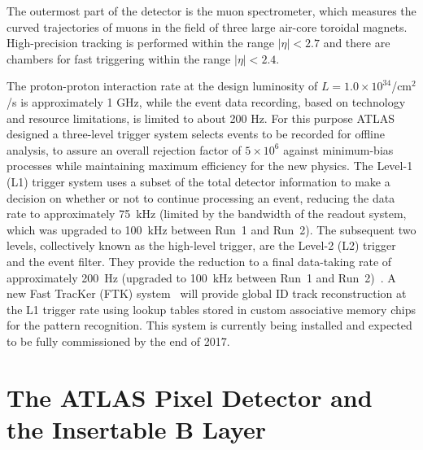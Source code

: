 The outermost part of the detector is the muon spectrometer, which measures the curved trajectories of muons in the field of three large air-core toroidal magnets. High-precision tracking is performed within the range $|\eta| < 2.7$ and there are chambers for fast triggering within the range $|\eta| < 2.4$.

The proton-proton interaction rate at the design luminosity of $L=1.0\times10^{34}$/cm$^{2}$/s 
is approximately 1 GHz, while the event data recording, based on technology and resource limitations, 
is limited to about 200 Hz. For this purpose ATLAS designed 
a three-level trigger system selects events to be recorded for offline analysis, to assure 
an overall rejection factor of $5\times10^{6}$ against minimum-bias processes while maintaining 
maximum efficiency for the new physics. 
The Level-1 (L1) trigger system uses a subset of the total detector information to make a decision on 
whether or not to continue processing an event, reducing the data rate to approximately 75~kHz (limited 
by the bandwidth of the readout system, which was upgraded to 100~kHz between Run~1 and Run~2). 
The subsequent two levels, 
collectively known as the high-level trigger, are the Level-2 (L2) trigger and the event filter. They provide 
the reduction to a final data-taking rate of approximately 200~Hz (upgraded to 100~kHz between 
Run~1 and Run~2)~\cite{AtlasTrigger2015}. A new Fast TracKer (FTK) system~\cite{FTKTDR} will 
provide global ID track reconstruction at the L1 trigger rate
using lookup tables stored in custom associative memory chips for the pattern recognition.  This 
system is currently being installed and expected to
be fully commissioned by the end of 2017.



\section{The ATLAS Pixel Detector and the Insertable B Layer}
\label{sec:ATLASPixelDetector}

